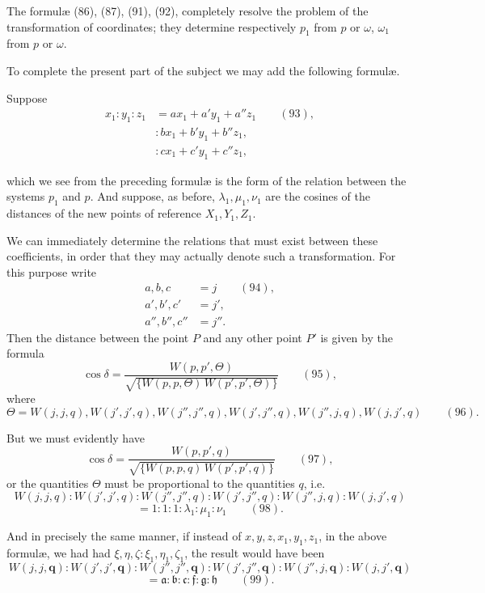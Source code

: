 \documentclass[11pt]{article}
\begin{document}
The formul\ae{} (86), (87), (91), (92), completely resolve the problem of the transformation of coordinates; they determine respectively $p_1$ from $p$ or $\omega$, $\omega_1$ from $p$ or $\omega$.

To complete the present part of the subject we may add the following formul\ae.

Suppose
\begin{align*}
x_1 : y_1 : z_1 &= ax_1 + a'y_1 + a''z_1 \qquad (93),\\
&: bx_1 + b'y_1 + b''z_1,\\
&: cx_1 + c'y_1 + c''z_1,
\end{align*}

\newpage
\setcounter{page}{223}

which we see from the preceding formul\ae{} is the form of the relation between the systems $p_1$ and $p$. And suppose, as before, $\lambda_1, \mu_1, \nu_1$ are the cosines of the distances of the new points of reference $X_1, Y_1, Z_1$.

We can immediately determine the relations that must exist between these coefficients, in order that they may actually denote such a transformation. For this purpose write
\begin{align*}
a, b, c &= j \qquad (94),\\
a', b', c' &= j',\\
a'', b'', c'' &= j''.
\end{align*}
Then the distance between the point $P$ and any other point $P'$ is given by the formula
\[
\cos\delta = \frac{W(p, p', \Theta)}{\sqrt{\{W(p, p, \Theta)\,W(p', p', \Theta)\}}} \qquad (95),
\]
where
\[
\Theta = W(j, j, q), W(j', j', q), W(j'', j'', q), W(j', j'', q), W(j'', j, q), W(j, j', q) \qquad (96).
\]

But we must evidently have
\[
\cos\delta = \frac{W(p, p', q)}{\sqrt{\{W(p, p, q)\,W(p', p', q)\}}} \qquad (97),
\]
or the quantities $\Theta$ must be proportional to the quantities $q$, i.e.
\[
W(j, j, q) : W(j', j', q) : W(j'', j'', q) : W(j', j'', q) : W(j'', j, q) : W(j, j', q)
\]
\[
= 1 : 1 : 1 : \lambda_1 : \mu_1 : \nu_1 \qquad (98).
\]

And in precisely the same manner, if instead of $x, y, z, x_1, y_1, z_1$, in the above formul\ae, we had had $\xi, \eta, \zeta : \xi_1, \eta_1, \zeta_1$, the result would have been
\[
W(j, j, \mathbf{q}) : W(j', j', \mathbf{q}) : W(j'', j'', \mathbf{q}) : W(j', j'', \mathbf{q}) : W(j'', j, \mathbf{q}) : W(j, j', \mathbf{q})
\]
\[
= \mathfrak{a} : \mathfrak{b} : \mathfrak{c} : \mathfrak{f} : \mathfrak{g} : \mathfrak{h} \qquad (99).
\]
\end{document}
